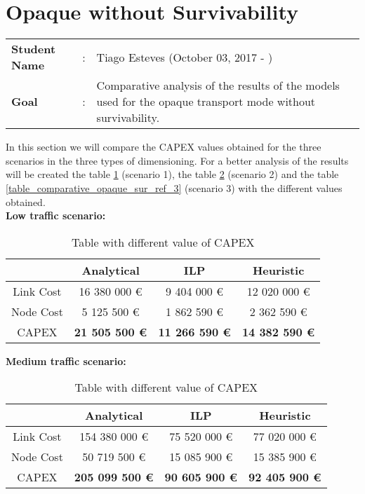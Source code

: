 \clearpage

\section{Opaque without Survivability}\label{comparative_Opaque_Survivability}
\begin{tcolorbox}	
\begin{tabular}{p{2.75cm} p{0.2cm} p{10.5cm}} 	
\textbf{Student Name}  &:& Tiago Esteves    (October 03, 2017 - )\\
\textbf{Goal}          &:& Comparative analysis of the results of the models used for the opaque transport mode without survivability.
\end{tabular}
\end{tcolorbox}
\vspace{11pt}


In this section we will compare the CAPEX values obtained for the three scenarios in the three types of dimensioning. For a better analysis of the results will be created the table \ref{table_comparative_opaque_sur_ref_1} (scenario 1), the table \ref{table_comparative_opaque_sur_ref_2} (scenario 2) and the table \ref{table_comparative_opaque_sur_ref_3} (scenario 3) with the different values obtained.\\

\textbf{Low traffic scenario:}

\begin{table}[h!]
\centering
\begin{tabular}{| c | c | c | c |}
 \hline
   & Analytical & ILP & Heuristic \\
 \hline\hline
 Link Cost & 16 380 000 \euro & 9 404 000 \euro & 12 020 000 \euro \\
 Node Cost & 5 125 500 \euro & 1 862 590 \euro & 2 362 590 \euro \\
 CAPEX & \textbf{21 505 500 \euro} & \textbf{11 266 590 \euro} & \textbf{14 382 590 \euro} \\
 \hline
\end{tabular}
\caption{Table with different value of CAPEX }
\label{table_comparative_opaque_sur_ref_1}
\end{table}


\vspace{11pt}
\textbf{Medium traffic scenario:}

\begin{table}[h!]
\centering
\begin{tabular}{| c | c | c | c |}
 \hline
   & Analytical & ILP & Heuristic \\
 \hline\hline
 Link Cost & 154 380 000 \euro & 75 520 000 \euro & 77 020 000 \euro \\
 Node Cost & 50 719 500 \euro & 15 085 900 \euro & 15 385 900 \euro \\
 CAPEX & \textbf{205 099 500 \euro} & \textbf{90 605 900 \euro} & \textbf{92 405 900 \euro} \\
 \hline
\end{tabular}
\caption{Table with different value of CAPEX }
\label{table_comparative_opaque_sur_ref_2}
\end{table}


